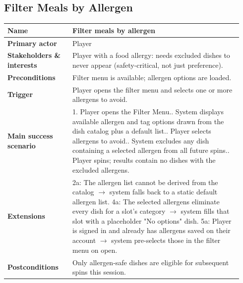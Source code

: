 \documentclass[sigconf]{acmart}
\begin{document}
\subsection*{Filter Meals by Allergen}
{\footnotesize
\begin{supertabular}{@{}p{0.26\linewidth}p{0.68\linewidth}@{}}
\textbf{Name} & Filter meals by allergen \\
\hline
\textbf{Primary actor} & Player \\
\hline
\textbf{Stakeholders \& interests} & Player with a food allergy: needs excluded dishes to never appear (safety-critical, not just preference). \\
\hline
\textbf{Preconditions} & Filter menu is available; allergen options are loaded. \\
\hline
\textbf{Trigger} & Player opens the filter menu and selects one or more allergens to avoid. \\
\hline
\textbf{Main success scenario} & 1. Player opens the Filter Menu.. System displays available allergen and tag options drawn from the dish catalog plus a default list.. Player selects allergens to avoid.. System excludes any dish containing a selected allergen from all future spins.. Player spins; results contain no dishes with the excluded allergens. \\
\hline
\textbf{Extensions} & 2a: The allergen list cannot be derived from the catalog $\rightarrow$ system falls back to a static default allergen list.\newline
4a: The selected allergens eliminate every dish for a slot's category $\rightarrow$ system fills that slot with a placeholder "No options" dish.\newline
5a: Player is signed in and already has allergens saved on their account $\rightarrow$ system pre-selects those in the filter menu on open. \\
\hline
\textbf{Postconditions} & Only allergen-safe dishes are eligible for subsequent spins this session. \\
\end{supertabular}
}
\end{document}

